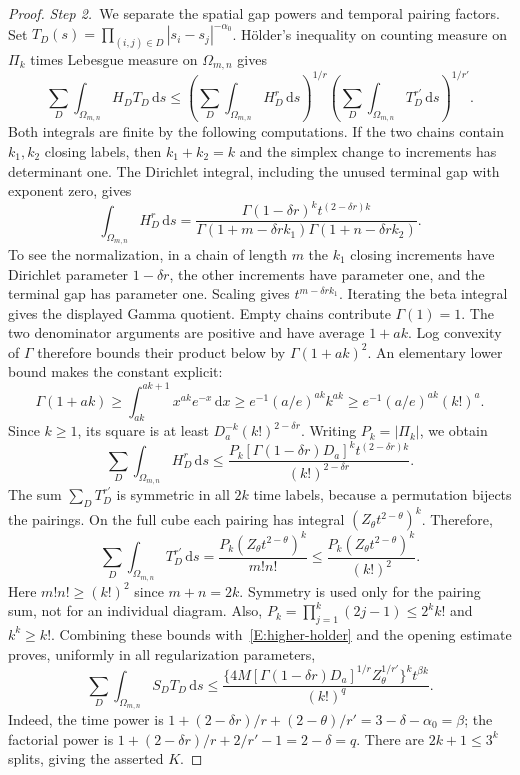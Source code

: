\documentclass[12pt,oneside,openany]{book}
\numberwithin{equation}{section}
\theoremstyle{nogostyle}
\theoremstyle{definition}
\newcommand{\ud}{\,\mathrm{d}}
\begin{document}
\begin{proof}
  \medskip
  \noindent\textit{Step 2.~}We separate the spatial gap powers and temporal
  pairing factors.
  Set $T_D(s) = \prod_{(i,j)\in D}|s_i-s_j|^{-\alpha_0}$. H\"older's inequality
  on counting measure on $\Pi_k$ times Lebesgue measure on $\Omega_{m,n}$ gives
  \begin{equation}\label{E:higher-holder}
    \sum_D\int_{\Omega_{m,n}}H_DT_D\ud s
    \le\left(\sum_D\int_{\Omega_{m,n}}H_D^r\ud s\right)^{1/r}
    \left(\sum_D\int_{\Omega_{m,n}}T_D^{r'}\ud s\right)^{1/r'}.
  \end{equation}
  Both integrals are finite by the following computations. If the two chains
  contain $k_1,k_2$ closing labels, then $k_1+k_2 = k$ and the simplex change to
  increments has determinant one. The Dirichlet integral, including the unused
  terminal gap with exponent zero, gives
  \[
    \int_{\Omega_{m,n}}H_D^r\ud s
    =\frac{\Gamma(1-\delta r)^k t^{(2-\delta r)k}}
    {\Gamma(1+m-\delta r k_1)\Gamma(1+n-\delta r k_2)}.
  \]
  To see the normalization, in a chain of length $m$ the $k_1$ closing
  increments have Dirichlet parameter $1-\delta r$, the other increments have
  parameter one, and the terminal gap has parameter one. Scaling gives
  $t^{m-\delta r k_1}$. Iterating the beta integral gives the displayed Gamma
  quotient. Empty chains contribute $\Gamma(1) = 1$. The two denominator
  arguments are positive and have average $1+ak$. Log convexity of $\Gamma$
  therefore bounds their product below by $\Gamma(1+ak)^2$. An elementary lower
  bound makes the constant explicit:
  \[
    \Gamma(1+ak)\ge\int_{ak}^{ak+1}x^{ak}e^{-x}\ud x
    \ge e^{-1}(a/e)^{ak}k^{ak}
    \ge e^{-1}(a/e)^{ak}(k!)^a.
  \]
  Since $k \ge 1$, its square is at least $D_a^{-k}(k!)^{2-\delta r}$. Writing
  $P_k = |\Pi_k|$, we obtain
  \[
    \sum_D\int_{\Omega_{m,n}}H_D^r\ud s
    \le\frac{P_k[\Gamma(1-\delta r)D_a]^k
    t^{(2-\delta r)k}}{(k!)^{2-\delta r}}.
  \]
  The sum $\sum_DT_D^{r'}$ is symmetric in all $2k$ time labels, because a
  permutation bijects the pairings. On the full cube each pairing has integral
  $(Z_\theta t^{2-\theta})^k$. Therefore,
  \[
    \sum_D\int_{\Omega_{m,n}}T_D^{r'}\ud s
    =\frac{P_k(Z_\theta t^{2-\theta})^k}{m!n!}
    \le\frac{P_k(Z_\theta t^{2-\theta})^k}{(k!)^2}.
  \]
  Here $m!n! \ge (k!)^2$ since $m+n = 2k$. Symmetry is used only for the pairing
  sum, not for an individual diagram. Also, $P_k = \prod_{j=1}^k(2j-1) \le
  2^kk!$ and $k^k \ge k!$. Combining these bounds with~\eqref{E:higher-holder}
  and the opening estimate proves, uniformly in all regularization parameters,
  \[
    \sum_D\int_{\Omega_{m,n}}S_D T_D\ud s
    \le\frac{\{4M[\Gamma(1-\delta r)D_a]^{1/r}
    Z_\theta^{1/r'}\}^k t^{\beta k}}{(k!)^q}.
  \]
  Indeed, the time power is $1+(2-\delta r)/r+(2-\theta)/r' = 3-\delta-\alpha_0
  = \beta$; the factorial power is $1+(2-\delta r)/r+2/r'-1 = 2-\delta = q$.
  There are $2k+1 \le 3^k$ splits, giving the asserted $K$.



\end{proof}
\end{document}
